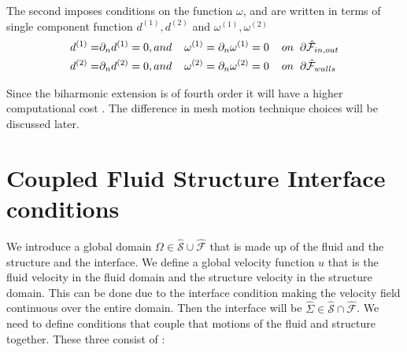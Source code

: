 The second imposes conditions on the function $\omega$, and are written in terms of single component function $d^{(1)},d^{(2)}$ and $\omega^{(1)}, \omega^{(2)}$	
\begin{align}
d^{(1)} =& \partial_n d^{(1)} = 0 , and \hspace{4mm}   \omega^{(1)} = \partial_n \omega^{(1)} = 0    \hspace{4mm} on \hspace{2mm} \partial \hat{\mathcal{F}}_{in,out} \\
d^{(2)} =& \partial_n d^{(2)} = 0 , and \hspace{4mm}   \omega^{(2)} = \partial_n \omega^{(2)} = 0    \hspace{4mm} on \hspace{2mm} \partial \hat{\mathcal{F}}_{walls} \\
\end{align}

Since the biharmonic extension is of fourth order it will have a higher computational cost \cite{Richter2016}. The difference in mesh motion technique choices will be discussed later.


\section{Coupled Fluid Structure Interface conditions}
We introduce a global domain $\Omega \in \hat{\mathcal{S}} \cup \hat{\mathcal{F}} $ that is made up of the fluid and the structure and the interface. We define a global velocity function $u$ that is the fluid velocity in the fluid domain and the structure velocity in the structure domain. This can be done due to the interface condition making the velocity field continuous over the entire domain. Then the interface will be $ \hat{\Sigma} \in \hat{\mathcal{S}} \cap \hat{\mathcal{F}}  $.\newline 
We need to define conditions that couple that motions of the fluid and structure together. These three consist of \cite{Richter2016}:


